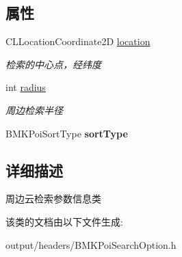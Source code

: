 \subsection*{属性}
\begin{DoxyCompactItemize}
\item 
\hypertarget{interface_b_m_k_nearby_search_option_ac03907184a27878ce07e1fce8ee38d3e}{}C\+L\+Location\+Coordinate2\+D \hyperlink{interface_b_m_k_nearby_search_option_ac03907184a27878ce07e1fce8ee38d3e}{location}\label{interface_b_m_k_nearby_search_option_ac03907184a27878ce07e1fce8ee38d3e}

\begin{DoxyCompactList}\small\item\em 检索的中心点，经纬度 \end{DoxyCompactList}\item 
\hypertarget{interface_b_m_k_nearby_search_option_ad3a9f2d3cc3668165c229741b8791f90}{}int \hyperlink{interface_b_m_k_nearby_search_option_ad3a9f2d3cc3668165c229741b8791f90}{radius}\label{interface_b_m_k_nearby_search_option_ad3a9f2d3cc3668165c229741b8791f90}

\begin{DoxyCompactList}\small\item\em 周边检索半径 \end{DoxyCompactList}\item 
\hypertarget{interface_b_m_k_nearby_search_option_a2b99b1326bfe03cb14a69fe592b3a6e9}{}B\+M\+K\+Poi\+Sort\+Type {\bfseries sort\+Type}\label{interface_b_m_k_nearby_search_option_a2b99b1326bfe03cb14a69fe592b3a6e9}

\end{DoxyCompactItemize}


\subsection{详细描述}
周边云检索参数信息类 

该类的文档由以下文件生成\+:\begin{DoxyCompactItemize}
\item 
output/headers/B\+M\+K\+Poi\+Search\+Option.\+h\end{DoxyCompactItemize}
